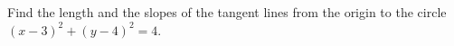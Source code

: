 Find the length and the slopes of the tangent lines from the origin to the circle $(x-3)^2+(y-4)^2=4$.
